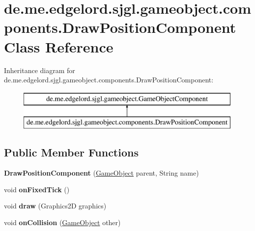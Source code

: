 \hypertarget{classde_1_1me_1_1edgelord_1_1sjgl_1_1gameobject_1_1components_1_1_draw_position_component}{}\section{de.\+me.\+edgelord.\+sjgl.\+gameobject.\+components.\+Draw\+Position\+Component Class Reference}
\label{classde_1_1me_1_1edgelord_1_1sjgl_1_1gameobject_1_1components_1_1_draw_position_component}
Inheritance diagram for de.\+me.\+edgelord.\+sjgl.\+gameobject.\+components.\+Draw\+Position\+Component\+:\begin{figure}[H]
\begin{center}
\leavevmode
\includegraphics[height=2.000000cm]{classde_1_1me_1_1edgelord_1_1sjgl_1_1gameobject_1_1components_1_1_draw_position_component}
\end{center}
\end{figure}
\subsection*{Public Member Functions}
\begin{DoxyCompactItemize}
\item 
\mbox{\label{classde_1_1me_1_1edgelord_1_1sjgl_1_1gameobject_1_1components_1_1_draw_position_component_aba3ac1124a979a5720837c49414bd516}} 
{\bfseries Draw\+Position\+Component} (\mbox{\hyperlink{classde_1_1me_1_1edgelord_1_1sjgl_1_1gameobject_1_1_game_object}{Game\+Object}} parent, String name)
\item 
\mbox{\label{classde_1_1me_1_1edgelord_1_1sjgl_1_1gameobject_1_1components_1_1_draw_position_component_a14895fa95edc90a198a50b7996ca0a42}} 
void {\bfseries on\+Fixed\+Tick} ()
\item 
\mbox{\label{classde_1_1me_1_1edgelord_1_1sjgl_1_1gameobject_1_1components_1_1_draw_position_component_a6636b5744cdd7c81a7bb644b9437ad2b}} 
void {\bfseries draw} (Graphics2D graphics)
\item 
\mbox{\label{classde_1_1me_1_1edgelord_1_1sjgl_1_1gameobject_1_1components_1_1_draw_position_component_abbfd19b43c54709975d2378c95811304}} 
void {\bfseries on\+Collision} (\mbox{\hyperlink{classde_1_1me_1_1edgelord_1_1sjgl_1_1gameobject_1_1_game_object}{Game\+Object}} other)
\end{DoxyCompactItemize}


